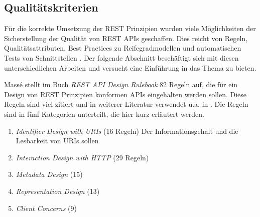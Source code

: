 \subsection{Qualitätskriterien}
Für die korrekte Umsetzung der REST Prinzipien wurden viele Möglichkeiten der Sicherstellung der Qualität von REST APIs geschaffen. Dies reicht von Regeln, Qualitätsattributen, Best Practices zu Reifegradmodellen und automatischen Tests von Schnittstellen \parencite{kotstein_which_2021}. Der folgende Abschnitt beschäftigt sich mit diesen unterschiedlichen Arbeiten und versucht eine Einführung in das Thema zu bieten.

Massé stellt im Buch \textit{REST API Design Rulebook} \parencite{masse_rest_2011} 82 Regeln auf, die für ein Design von REST Prinzipien konformen APIs eingehalten werden sollen. Diese Regeln sind viel zitiert und in weiterer Literatur verwendet u.a. in \parencite{kotstein_which_2021}. Die Regeln sind in fünf Kategorien unterteilt, die hier kurz erläutert werden.
\begin{enumerate}
  \item \textit{Identifier Design with URIs} (16 Regeln) Der Informationsgehalt und die Lesbarkeit von URIs sollen 
  \item \textit{Interaction Design with HTTP} (29 Regeln)
  \item \textit{Metadata Design} (15)
  \item \textit{Representation Design} (13)
  \item \textit{Client Concerns} (9) 
\end{enumerate}


